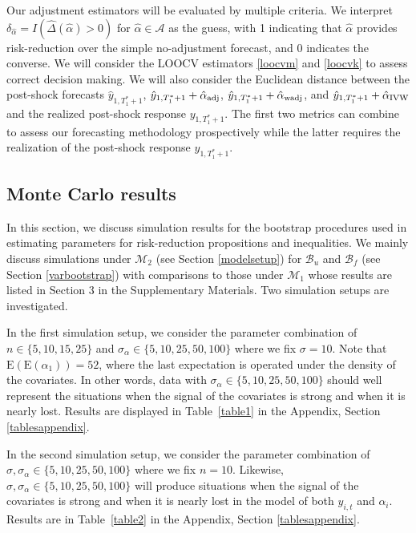 \documentclass[11pt]{article}
\def\mc#1{\mathcal{#1}} %
\def\E#1{\mathrm{E}(#1)} %
\theoremstyle{definition}
\begin{document}
Our adjustment estimators will be evaluated by multiple criteria. We interpret $\delta_{\hat{\alpha}}= I(\hat{\Delta}(\hat{\alpha})>0)$ for $\hat{\alpha}\in \mc{A}$ as the guess, with 1 indicating that $\hat{\alpha}$ provides risk-reduction over the simple no-adjustment forecast, and 0 indicates the converse. We will consider the LOOCV estimators \eqref{loocvm} and \eqref{loocvk} to assess correct decision making. We will also consider the Euclidean distance between the post-shock forecasts $\hat{y}_{1,T_1^*+1}$, $\hat{y}_{1,T_1^*+1}+ \hat{\alpha}_{\rm adj}$, $\hat{y}_{1,T_1^*+1}+\hat{\alpha}_{\rm wadj}$, and $\hat{y}_{1,T_1^*+1}+\hat{\alpha}_{\rm IVW}$ and the realized post-shock response $y_{1,T_1^*+1}$. The first two metrics can combine to assess our forecasting methodology prospectively while the latter requires the realization of the post-shock response $y_{1,T_1^*+1}$. 



\subsection{Monte Carlo results}
\label{parametricbootstrapsimulation}

In this section, we discuss simulation results for the bootstrap procedures used in estimating parameters for risk-reduction propositions and inequalities. We mainly discuss simulations under $\mc{M}_2$ (see Section \ref{modelsetup}) for $\mc{B}_u$ and $\mc{B}_f$ (see Section \ref{varbootstrap}) with comparisons to those under $\mc{M}_1$ whose results are listed in Section 3 in the Supplementary Materials. Two simulation setups are investigated. 

In the first simulation setup, we consider the parameter combination of  $n \in \{5, 10, 15, 25\}$ and $\sigma_{\alpha} \in  \{5, 10, 25, 50, 100\}$ where we fix $\sigma=10$. Note that $\E{\E{\alpha_1}}=52$, where the last expectation is operated under the density of the covariates. In other words, data with $\sigma_{\alpha} \in  \{5, 10, 25, 50, 100\}$  should well represent the situations when the signal of the covariates is strong and when it is nearly lost. Results are displayed in Table~\ref{table1} in the Appendix, Section \ref{tablesappendix}.


In the second simulation setup, we consider the parameter combination of $\sigma, \sigma_{\alpha} \in  \{5, 10, 25, 50, 100\}$ where we fix $n=10$. Likewise, $\sigma, \sigma_{\alpha} \in  \{5, 10, 25, 50, 100\}$ will produce situations when the signal of the covariates is strong and when it is nearly lost in the model of  both $y_{i,t}$ and $\alpha_i$. Results are  in Table~\ref{table2} in the Appendix, Section \ref{tablesappendix}.
\end{document}
